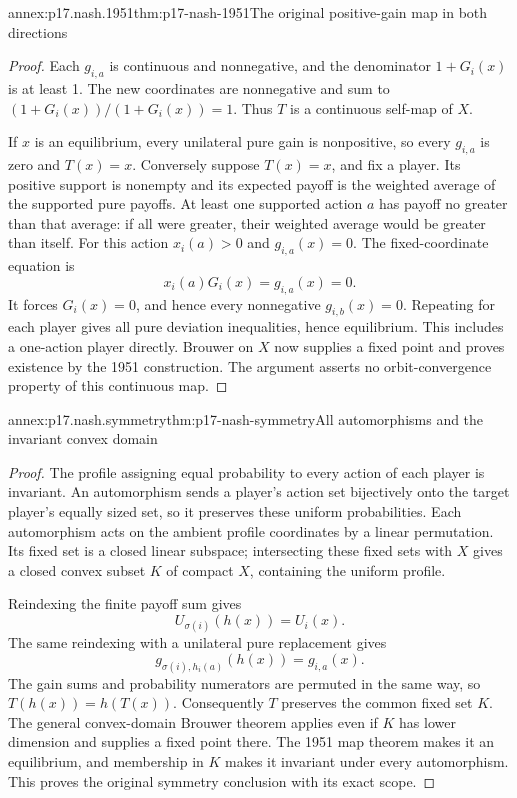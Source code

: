 \begin{annexitem}{annex:p17.nash.1951}{thm:p17-nash-1951}{The original positive-gain map in both directions}
\begin{proof}
Each \(g_{i,a}\) is continuous and nonnegative,
and the denominator \(1+G_i(x)\) is at least 1.
The new coordinates are nonnegative and sum to
\((1+G_i(x))/(1+G_i(x))=1\).
Thus \(T\) is a continuous self-map of \(X\).

If \(x\) is an equilibrium, every unilateral
pure gain is nonpositive, so every \(g_{i,a}\)
is zero and \(T(x)=x\).
Conversely suppose \(T(x)=x\), and fix a player.
Its positive support is nonempty and its
expected payoff is the weighted average
of the supported pure payoffs.
At least one supported action \(a\)
has payoff no greater than that average:
if all were greater, their weighted
average would be greater than itself.
For this action \(x_i(a)>0\) and
\(g_{i,a}(x)=0\).
The fixed-coordinate equation is
\[
                     x_i(a)G_i(x)=g_{i,a}(x)=0.
\]
It forces \(G_i(x)=0\), and hence every
nonnegative \(g_{i,b}(x)=0\).
Repeating for each player gives all pure
deviation inequalities, hence equilibrium.
This includes a one-action player directly.
Brouwer on \(X\) now supplies a fixed point
and proves existence by the 1951 construction.
The argument asserts no orbit-convergence
property of this continuous map.
\end{proof}
\end{annexitem}

\begin{annexitem}{annex:p17.nash.symmetry}{thm:p17-nash-symmetry}{All automorphisms and the invariant convex domain}
\begin{proof}
The profile assigning equal probability to
every action of each player is invariant.
An automorphism sends a player's action
set bijectively onto the target player's
equally sized set, so it preserves these
uniform probabilities.
Each automorphism acts on the ambient
profile coordinates by a linear permutation.
Its fixed set is a closed linear subspace;
intersecting these fixed sets with \(X\)
gives a closed convex subset \(K\) of
compact \(X\), containing the uniform
profile.

Reindexing the finite payoff sum gives
\[
              U_{\sigma(i)}(h(x))=U_i(x).
\]
The same reindexing with a unilateral pure
replacement gives
\[
       g_{\sigma(i),h_i(a)}(h(x))=g_{i,a}(x).
\]
The gain sums and probability numerators
are permuted in the same way, so
\(T(h(x))=h(T(x))\).
Consequently \(T\) preserves the common
fixed set \(K\). The general convex-domain
Brouwer theorem applies even if \(K\)
has lower dimension and supplies a
fixed point there. The 1951 map theorem
makes it an equilibrium, and membership
in \(K\) makes it invariant under every
automorphism. This proves the original
symmetry conclusion with its exact scope.
\end{proof}
\end{annexitem}

